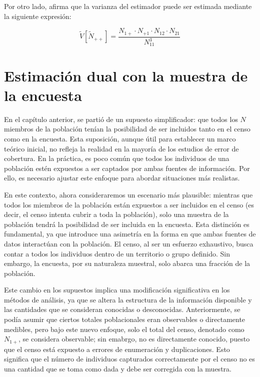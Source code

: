 \documentclass[
  12pt,
]{book}
\begin{document}
Por otro lado, \citet{wolter1986coverage} afirma que la varianza del estimador puede ser estimada mediante la siguiente expresión:

\[
\tilde V[\tilde{N}_{++}] = \frac{N_{1+} \cdot N_{+1} \cdot N_{12} \cdot N_{21}  }{N_{11}^3}
\]

\hypertarget{estimaciuxf3n-dual-con-la-muestra-de-la-encuesta}{%
\chapter{Estimación dual con la muestra de la encuesta}\label{estimaciuxf3n-dual-con-la-muestra-de-la-encuesta}}

En el capítulo anterior, se partió de un supuesto simplificador: que todos los \(N\) miembros de la población tenían la posibilidad de ser incluidos tanto en el censo como en la encuesta. Esta suposición, aunque útil para establecer un marco teórico inicial, no refleja la realidad en la mayoría de los estudios de error de cobertura. En la práctica, es poco común que todos los individuos de una población estén expuestos a ser captados por ambas fuentes de información. Por ello, es necesario ajustar este enfoque para abordar situaciones más realistas.

En este contexto, ahora consideraremos un escenario más plausible: mientras que todos los miembros de la población están expuestos a ser incluidos en el censo (es decir, el censo intenta cubrir a toda la población), solo una muestra de la población tendrá la posibilidad de ser incluida en la encuesta. Esta distinción es fundamental, ya que introduce una asimetría en la forma en que ambas fuentes de datos interactúan con la población. El censo, al ser un esfuerzo exhaustivo, busca contar a todos los individuos dentro de un territorio o grupo definido. Sin embargo, la encuesta, por su naturaleza muestral, solo abarca una fracción de la población.

Este cambio en los supuestos implica una modificación significativa en los métodos de análisis, ya que se altera la estructura de la información disponible y las cantidades que se consideran conocidas o desconocidas. Anteriormente, se podía asumir que ciertos totales poblacionales eran observables o directamente medibles, pero bajo este nuevo enfoque, solo el total del censo, denotado como \(N_{1+}\), se considera observable; sin emabrgo, no es directamente conocido, puesto que el censo está expuesto a errores de enumeración y duplicaciones. Esto significa que el número de individuos capturados correctamente por el censo no es una cantidad que se toma como dada y debe ser corregida con la muestra.
\end{document}
